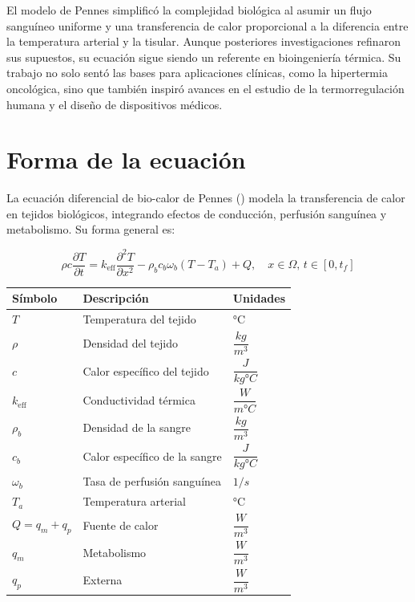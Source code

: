 \documentclass[
  spanish,
  us-letterpaper,
  DIV=11,
  numbers=noendperiod]{scrreprt}
\begin{document}
El modelo de Pennes simplificó la complejidad biológica al asumir un
flujo sanguíneo uniforme y una transferencia de calor proporcional a la
diferencia entre la temperatura arterial y la tisular. Aunque
posteriores investigaciones refinaron sus supuestos, su ecuación sigue
siendo un referente en bioingeniería térmica. Su trabajo no solo sentó
las bases para aplicaciones clínicas, como la hipertermia oncológica,
sino que también inspiró avances en el estudio de la termorregulación
humana y el diseño de dispositivos médicos.

\chapter{Forma de la ecuación}\label{forma-de-la-ecuaciuxf3n}

La ecuación diferencial de bio-calor de Pennes
() modela la transferencia de calor en
tejidos biológicos, integrando efectos de conducción, perfusión
sanguínea y metabolismo. Su forma general es:

\begin{equation}\label{eq:PBHE_completa}
\rho c \frac{\partial T}{\partial t} = k_{\text{eff}} \frac{\partial^{2} T}{\partial x^{2}} - \rho_b c_b \omega_b (T - T_a) + Q, \quad x \in \Omega, \, t \in [0, t_f]
\end{equation}

\begin{longtable}[]{@{}lll@{}}
\toprule\noalign{}
Símbolo & Descripción & Unidades \\
\midrule\noalign{}
\endhead
\bottomrule\noalign{}
\endlastfoot
\(T\) & Temperatura del tejido & °C \\
\(\rho\) & Densidad del tejido & \(\dfrac{kg}{m^3}\) \\
\(c\) & Calor específico del tejido & \(\dfrac{J}{kg °C}\) \\
\(k_{\text{eff}}\) & Conductividad térmica & \(\dfrac{W}{m °C}\) \\
\(\rho_b\) & Densidad de la sangre & \(\dfrac{kg}{m^3}\) \\
\(c_b\) & Calor específico de la sangre & \(\dfrac{J}{kg °C}\) \\
\(\omega_b\) & Tasa de perfusión sanguínea & \(1/s\) \\
\(T_a\) & Temperatura arterial & °C \\
\(Q = q_m + q_p\) & Fuente de calor & \(\dfrac{W}{m^3}\) \\
\(q_m\) & Metabolismo & \(\dfrac{W}{m^3}\) \\
\(q_p\) & Externa & \(\dfrac{W}{m^3}\) \\
\end{longtable}
\end{document}
